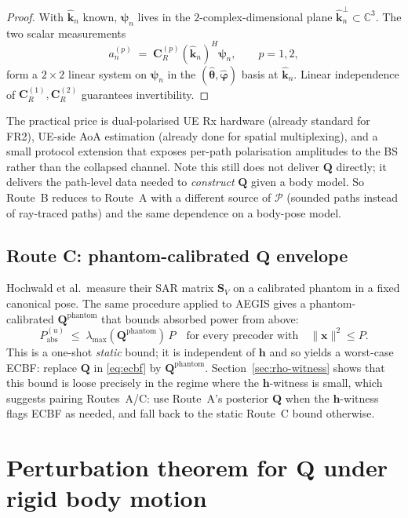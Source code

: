 \documentclass[11pt,a4paper]{article}
\theoremstyle{definition}
\newcommand{\xx}{\mathbf{x}}
\newcommand{\hh}{\mathbf{h}}
\newcommand{\kh}{\hat{\mathbf{k}}}
\newcommand{\Q}{\mathbf{Q}}
\newcommand{\Cp}{\mathbf{C}}
\newcommand{\psib}{\boldsymbol{\psi}}
\newcommand{\C}{\mathbb{C}}
\newcommand{\lammax}{\lambda_{\max}}
\begin{document}
\begin{proof}
With $\kh_n$ known, $\psib_n$ lives in the $2$-complex-dimensional plane
$\kh_n^{\perp}\subset\C^3$. The two scalar measurements
\[
  a_n^{(p)} \;=\; \Cp_R^{(p)}(\kh_n)^H\psib_n,\qquad p=1,2,
\]
form a $2\times 2$ linear system on $\psib_n$ in the
$(\hat{\boldsymbol{\theta}},\hat{\boldsymbol{\varphi}})$ basis at $\kh_n$.
Linear independence of $\Cp_R^{(1)},\Cp_R^{(2)}$ guarantees
invertibility.
\end{proof}

The practical price is dual-polarised UE Rx hardware (already standard for FR2),
UE-side AoA estimation (already done for spatial multiplexing), and a
small protocol extension that exposes per-path polarisation amplitudes
to the BS rather than the collapsed channel. Note this still does not
deliver $\Q$ directly; it delivers the path-level data needed to
\emph{construct} $\Q$ given a body model. So Route~B reduces to
Route~A with a different source of $\mathcal{P}$ (sounded paths instead of
ray-traced paths) and the same dependence on a body-pose model.

\subsection{Route C: phantom-calibrated \texorpdfstring{$\Q$}{Q} envelope}

Hochwald et al.\ measure their SAR matrix $\mathbf{S}_V$ on a calibrated
phantom in a fixed canonical pose. The same procedure applied to AEGIS
gives a phantom-calibrated $\Q^{\mathrm{phantom}}$ that bounds absorbed
power from above:
\[
  P_{\mathrm{abs}}^{(u)} \;\le\; \lammax(\Q^{\mathrm{phantom}})\,P
  \quad\text{for every precoder with}\quad \|\xx\|^2\le P.
\]
This is a one-shot \emph{static} bound; it is independent of $\hh$ and so
yields a worst-case ECBF: replace $\Q$ in \eqref{eq:ecbf} by
$\Q^{\mathrm{phantom}}$. Section~\ref{sec:rho-witness} shows that this
bound is loose precisely in the regime where the $\hh$-witness is small,
which suggests pairing Routes~A/C: use Route~A's posterior $\Q$
when the $\hh$-witness flags ECBF as needed, and fall back to the static
Route~C bound otherwise.

\section{Perturbation theorem for \texorpdfstring{$\Q$}{Q} under rigid body motion}
\label{sec:perturbation}
\end{document}
